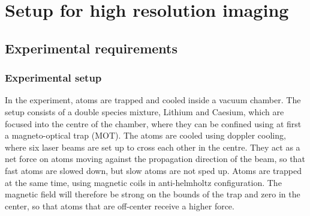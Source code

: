 \chapter{Setup for high resolution imaging}

\section{Experimental requirements}
\subsection{Experimental setup}
	In the experiment, atoms are trapped and cooled inside a vacuum chamber. The setup\cite{Repp2013a} consists of a double species mixture, Lithium and Caesium, which are focused into the centre of the chamber, where they can be confined using at first a magneto-optical trap (MOT). The atoms are cooled using doppler cooling, where six laser beams are set up to cross each other in the centre. They act as a net force on atoms moving against the propagation direction of the beam, so that fast atoms are slowed down, but slow atoms are not sped up. Atoms are trapped at the same time, using magnetic coils in anti-helmholtz configuration. The magnetic field will therefore be strong on the bounds of the trap and zero in the center, so that atoms that are off-center receive a higher force.
	
	
